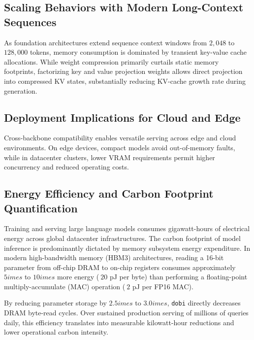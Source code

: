\subsection{Scaling Behaviors with Modern Long-Context Sequences}
As foundation architectures extend sequence context windows from $2{,}048$ to $128{,}000$ tokens, memory consumption is dominated by transient key-value cache allocations. While weight compression primarily curtails static memory footprints, factorizing key and value projection weights allows direct projection into compressed KV states, substantially reducing KV-cache growth rate during generation.

\subsection{Deployment Implications for Cloud and Edge}
Cross-backbone compatibility enables versatile serving across edge and cloud environments. On edge devices, compact models avoid out-of-memory faults, while in datacenter clusters, lower VRAM requirements permit higher concurrency and reduced operating costs.

\subsection{Energy Efficiency and Carbon Footprint Quantification}
Training and serving large language models consumes gigawatt-hours of electrical energy across global datacenter infrastructures. The carbon footprint of model inference is predominantly dictated by memory subsystem energy expenditure. In modern high-bandwidth memory (HBM3) architectures, reading a 16-bit parameter from off-chip DRAM to on-chip registers consumes approximately $5	imes$ to $10	imes$ more energy ($~20$ pJ per byte) than performing a floating-point multiply-accumulate (MAC) operation ($~2$ pJ per FP16 MAC).

By reducing parameter storage by $2.5	imes$ to $3.0	imes$, \texttt{dobi} directly decreases DRAM byte-read cycles. Over sustained production serving of millions of queries daily, this efficiency translates into measurable kilowatt-hour reductions and lower operational carbon intensity.
